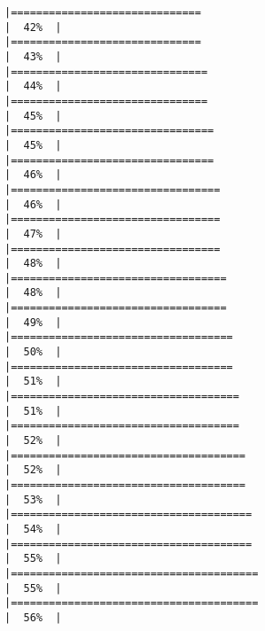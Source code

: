 \documentclass[
]{book}
\begin{document}
\begin{verbatim}
|==============================                                        |  42%  |                                                                              |==============================                                        |  43%  |                                                                              |===============================                                       |  44%  |                                                                              |===============================                                       |  45%  |                                                                              |================================                                      |  45%  |                                                                              |================================                                      |  46%  |                                                                              |=================================                                     |  46%  |                                                                              |=================================                                     |  47%  |                                                                              |=================================                                     |  48%  |                                                                              |==================================                                    |  48%  |                                                                              |==================================                                    |  49%  |                                                                              |===================================                                   |  50%  |                                                                              |===================================                                   |  51%  |                                                                              |====================================                                  |  51%  |                                                                              |====================================                                  |  52%  |                                                                              |=====================================                                 |  52%  |                                                                              |=====================================                                 |  53%  |                                                                              |======================================                                |  54%  |                                                                              |======================================                                |  55%  |                                                                              |=======================================                               |  55%  |                                                                              |=======================================                               |  56%  |                                                                              
\end{verbatim}
\end{document}
